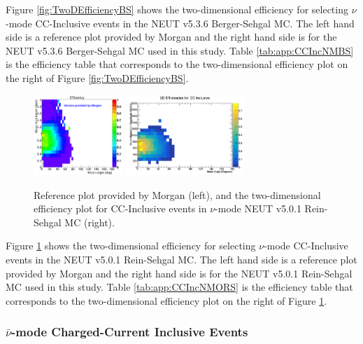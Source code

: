 \documentclass[11pt]{article}
\begin{document}
Figure \ref*{fig:TwoDEfficiencyBS} shows the two-dimensional efficiency for selecting $\nu$-mode CC-Inclusive events in the NEUT v5.3.6 Berger-Sehgal MC. The left hand side is a reference plot provided by Morgan and the right hand side is for the NEUT v5.3.6 Berger-Sehgal MC used in this study. Table \ref*{tab:app:CCIncNMBS} is the efficiency table that corresponds to the two-dimensional efficiency plot on the right of Figure \ref*{fig:TwoDEfficiencyBS}.

\begin{figure}[H]
\centering
\includegraphics[width=0.3\textwidth]{CCInclusivePlots/MorgansCCInclusiveSample.png}
\includegraphics[width=0.4\textwidth]{CCInclusivePlots/2DEffCompareNMORS.png}
\caption{Reference plot provided by Morgan (left), and the two-dimensional efficiency plot for CC-Inclusive events in $\nu$-mode NEUT v5.0.1 Rein-Sehgal MC (right).}
\label{fig:TwoDEfficiencyORS}
\end{figure}

Figure \ref*{fig:TwoDEfficiencyORS} shows the two-dimensional efficiency for selecting $\nu$-mode CC-Inclusive events in the NEUT v5.0.1 Rein-Sehgal MC. The left hand side is a reference plot provided by Morgan and the right hand side is for the NEUT v5.0.1 Rein-Sehgal MC used in this study. Table \ref*{tab:app:CCIncNMORS} is the efficiency table that corresponds to the two-dimensional efficiency plot on the right of Figure \ref*{fig:TwoDEfficiencyORS}.

\subsubsection{$\bar{\nu}$-mode Charged-Current Inclusive Events}
\label{subsub:antiNuModeCCInclusive}
\end{document}
